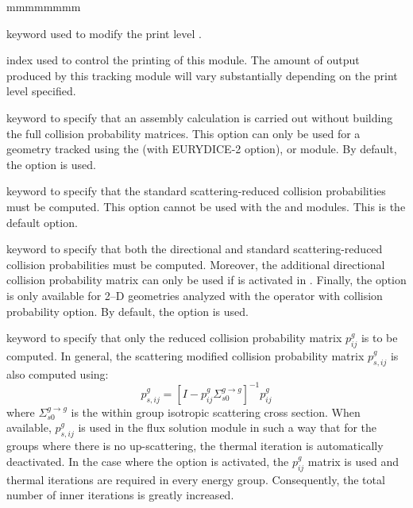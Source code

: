 \begin{ListeDeDescription}{mmmmmmmm}

\item[\moc{EDIT}] keyword used to modify the print level .

\item[\dusa{iprint}] index used to control the printing of this module. The
amount of output produced by this tracking module will vary substantially
depending on the print level specified. 

\item[\moc{ARM}] keyword to specify that an
assembly calculation is carried out without building the full collision
probability matrices. This option can only be used for a geometry tracked using
the  (with EURYDICE-2 option),  or  module. By default,
the  option is used.

\item[\moc{PIJ}] keyword to specify that the standard scattering-reduced collision
probabilities must be computed. This option cannot be used with the  and 
modules. This is the default option.

\item[\moc{PIJK}] keyword to specify that both the directional and standard
scattering-reduced collision probabilities must be computed. Moreover, the additional directional
collision probability matrix can only be used if  is activated in
. Finally, the 
option is only available for 2--D geometries analyzed with the operator
 with collision probability option. By default, the 
option is used.

\item[\moc{SKIP}] keyword to specify that only the reduced collision
probability matrix $p^{g}_{ij}$ is to be computed. In general, the scattering
modified collision probability matrix $p^{g}_{s,ij}$ is also computed using:
  $$
p^{g}_{s,ij}=\left[ I-p^{g}_{ij} \Sigma^{g\to g}_{s0} \right] ^{-1}
p^{g}_{ij}
  $$
where $\Sigma^{g\to g}_{s0}$ is the within group isotropic scattering cross
section. When available, $p^{g}_{s,ij}$ is used in the flux solution module in
such a way that for the groups where there is no up-scattering, the thermal
iteration is automatically deactivated. In the case where the  option
is activated, the $p^{g}_{ij}$ matrix is used and thermal iterations are
required in every energy group. Consequently, the total number of inner
iterations is greatly increased.


\end{ListeDeDescription}
